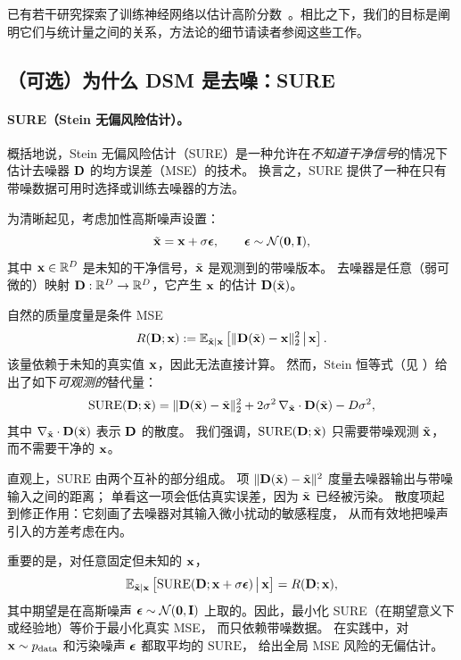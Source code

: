已有若干研究探索了训练神经网络以估计高阶分数~\citep{meng2021estimating,lu2022maximum,lai2023fp}。相比之下，我们的目标是阐明它们与统计量之间的关系，方法论的细节请读者参阅这些工作。

\subsection{（可选）为什么 DSM 是去噪：SURE}\label{subsec:why-dsm-denoising-sure}


\paragraph{SURE（Stein 无偏风险估计）。}
概括地说，Stein 无偏风险估计（SURE）是一种允许在\emph{不知道干净信号}的情况下估计去噪器 ${\mathbf{D}}$ 的均方误差（MSE）的技术。
换言之，SURE 提供了一种在只有带噪数据可用时选择或训练去噪器的方法。

为清晰起见，考虑加性高斯噪声设置：
\[
\tilde{{\mathbf{x}}} = {\mathbf{x}} + \sigma \bm{\epsilon}, 
\qquad \bm{\epsilon} \sim \mathcal{N}(\mathbf{0},{\mathbf{I}}),
\]
其中 ${\mathbf{x}} \in \mathbb{R}^D$ 是未知的干净信号，$\tilde{{\mathbf{x}}}$ 是观测到的带噪版本。
去噪器是任意（弱可微的）映射 ${\mathbf{D}}:\mathbb{R}^D \to \mathbb{R}^D$，它产生 ${\mathbf{x}}$ 的估计 ${\mathbf{D}}(\tilde{{\mathbf{x}}})$。

自然的质量度量是条件 MSE
\[
R({\mathbf{D}};{\mathbf{x}}) := \mathbb{E}_{\tilde{{\mathbf{x}}}|{\mathbf{x}}}\left[\|{\mathbf{D}}(\tilde{{\mathbf{x}}})-{\mathbf{x}}\|_2^2 \,\big|\, {\mathbf{x}}\right].
\]
该量依赖于未知的真实值 ${\mathbf{x}}$，因此无法直接计算。
然而，Stein 恒等式（见 ）给出了如下\emph{可观测的}替代量：
\begin{align}\label{eq:sure-obj}
    \mathrm{SURE}({\mathbf{D}};\tilde{{\mathbf{x}}})
    = \|{\mathbf{D}}(\tilde{{\mathbf{x}}})-\tilde{{\mathbf{x}}}\|_2^2
    + 2\sigma^2\,\nabla_{\tilde{{\mathbf{x}}}}\cdot {\mathbf{D}}(\tilde{{\mathbf{x}}})
    - D\sigma^2,
\end{align}
其中 $\nabla_{\tilde{{\mathbf{x}}}}\cdot {\mathbf{D}}(\tilde{{\mathbf{x}}})$ 表示 ${\mathbf{D}}$ 的散度。
我们强调，$\mathrm{SURE}({\mathbf{D}};\tilde{{\mathbf{x}}})$ 只需要带噪观测 $\tilde{{\mathbf{x}}}$，而不需要干净的 ${\mathbf{x}}$。

直观上，$\mathrm{SURE}$ 由两个互补的部分组成。
项 $\|{\mathbf{D}}(\tilde{{\mathbf{x}}})-\tilde{{\mathbf{x}}}\|^2$ 度量去噪器输出与带噪输入之间的距离；
单看这一项会低估真实误差，因为 $\tilde{{\mathbf{x}}}$ 已经被污染。
散度项起到修正作用：它刻画了去噪器对其输入微小扰动的敏感程度，
从而有效地把噪声引入的方差考虑在内。


重要的是，对任意固定但未知的 ${\mathbf{x}}$，
\[
\mathbb{E}_{\tilde{{\mathbf{x}}}|{\mathbf{x}}}\left[\mathrm{SURE}({\mathbf{D}};{\mathbf{x}}+\sigma{\bm{\epsilon}}) \,\big|\, {\mathbf{x}}\right]
= R({\mathbf{D}};{\mathbf{x}}),
\]
其中期望是在高斯噪声 ${\bm{\epsilon}}\sim\mathcal{N}(\bm{0},{\mathbf{I}})$ 上取的。因此，最小化 SURE（在期望意义下或经验地）等价于最小化真实 MSE，
而只依赖带噪数据。
在实践中，对 ${\mathbf{x}}\sim p_{\mathrm{data}}$ 和污染噪声 ${\bm{\epsilon}}$ 都取平均的 $\mathrm{SURE}$，
给出全局 MSE 风险的无偏估计。


